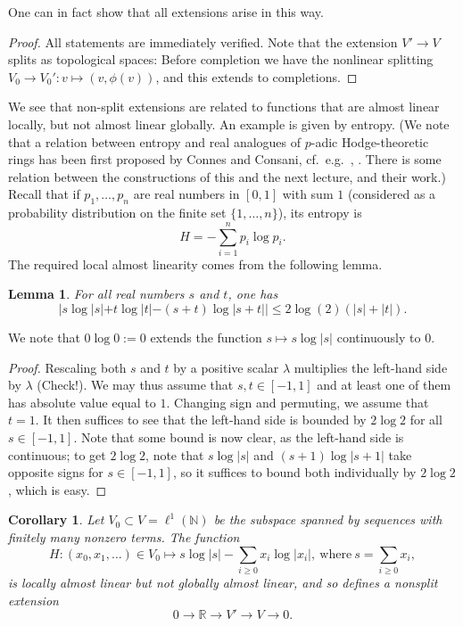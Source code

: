 \documentclass[11pt]{amsbook}
\numberwithin{equation}{section}
\numberwithin{theorem}{section}
\newtheorem{lemma}[theorem]{Lemma}
\newtheorem{corollary}[theorem]{Corollary}
\theoremstyle{definition}
\begin{document}
One can in fact show that all extensions arise in this way.

\begin{proof} All statements are immediately verified. Note that the extension $V'\to V$ splits as topological spaces: Before completion we have the nonlinear splitting $V_0\to V_0': v\mapsto (v,\phi(v))$, and this extends to completions.
\end{proof}

We see that non-split extensions are related to functions that are almost linear locally, but not almost linear globally. An example is given by entropy. (We note that a relation between entropy and real analogues of $p$-adic Hodge-theoretic rings has been first proposed by Connes and Consani, cf.~e.g.~\cite{ConnesConsani1}, \cite{ConnesWitt}. There is some relation between the constructions of this and the next lecture, and their work.) Recall that if $p_1,\ldots,p_n$ are real numbers in $[0,1]$ with sum $1$ (considered as a probability distribution on the finite set $\{1,\ldots,n\}$), its entropy is
\[
H=-\sum_{i=1}^n p_i \log p_i.
\]
The required local almost linearity comes from the following lemma.

\begin{lemma}\label{lem:entropyalmostlinear} For all real numbers $s$ and $t$, one has
\[
	|s\log|s|+t\log|t|-(s+t)\log|s+t||\leq 2\log(2)(|s|+|t|).
\]
\end{lemma}

We note that $0\log 0 := 0$ extends the function $s\mapsto s\log|s|$ continuously to $0$.

\begin{proof} Rescaling both $s$ and $t$ by a positive scalar $\lambda$ multiplies the left-hand side by $\lambda$ (Check!). We may thus assume that $s,t\in [-1,1]$ and at least one of them has absolute value equal to $1$. Changing sign and permuting, we assume that $t=1$. It then suffices to see that the left-hand side is bounded by $2\log 2$ for all $s\in [-1,1]$. Note that some bound is now clear, as the left-hand side is continuous; to get $2\log 2$, note that $s\log|s|$ and $(s+1)\log|s+1|$ take opposite signs for $s\in[-1,1]$, so it suffices to bound both individually by $2\log 2$, which is easy.
\end{proof}

\begin{corollary} Let $V_0\subset V=\ell^1(\mathbb N)$ be the subspace spanned by sequences with finitely many nonzero terms. The function
\[
H: (x_0,x_1,\ldots)\in V_0\mapsto s\log|s| - \sum_{i\geq 0} x_i\log|x_i| ,\ \mathrm{where}\ s=\sum_{i\geq 0} x_i,
\]
is locally almost linear but not globally almost linear, and so defines a nonsplit extension
\[
0\to \mathbb R\to V'\to V\to 0.
\]
\end{corollary}
\end{document}
